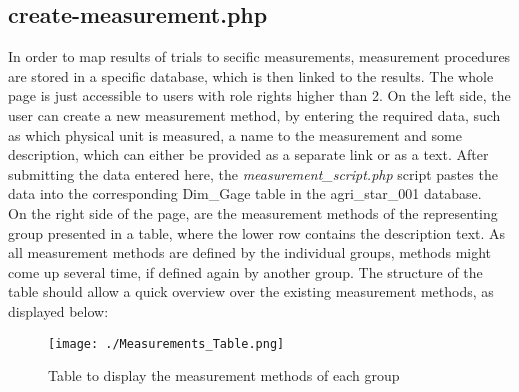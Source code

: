\subsection{create-measurement.php}
In order to map results of trials to secific measurements, measurement procedures are stored in a specific database, which is then linked to the results. The whole page is just accessible to users with 
role rights higher than 2. On the left side, the user can create a new measurement method, by entering the required data, such as which physical unit is measured, a name to the measurement and some 
description, which can either be provided as a separate link or as a text. After submitting the data entered here, the \emph{measurement\_script.php} script pastes the data into the corresponding 
Dim\_Gage table in the agri\_star\_001 database.\\
On the right side of the page, are the measurement methods of the representing group presented in a table, where the lower row contains the description text. As all measurement methods are defined by 
the individual groups, methods might come up several time, if defined again by another group. The structure of the table should allow a quick overview over the existing measurement methods, as displayed 
below:
\begin{figure}[h!]
 \centering
 \texttt{[image: ./Measurements\_Table.png]}
 \caption{Table to display the measurement methods of each group}
\end{figure}

